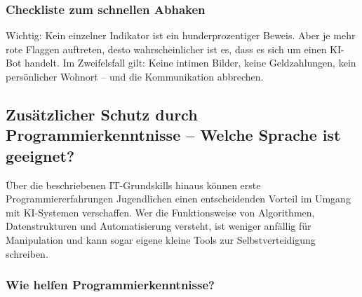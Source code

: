 \documentclass[12pt,a4paper,oneside]{scrartcl}
\begin{document}
	\subsubsection{Checkliste zum schnellen Abhaken}
	
	\noindent
	
	Wichtig: Kein einzelner Indikator ist ein hunderprozentiger Beweis. Aber je mehr rote Flaggen auftreten, desto wahrscheinlicher ist es, dass es sich um einen KI-Bot handelt. Im Zweifelsfall gilt: Keine intimen Bilder, keine Geldzahlungen, kein persönlicher Wohnort – und die Kommunikation abbrechen.
	
	\subsection{Zusätzlicher Schutz durch Programmierkenntnisse – Welche Sprache ist geeignet?}
	
	Über die beschriebenen IT-Grundskills hinaus können erste Programmiererfahrungen Jugendlichen einen entscheidenden Vorteil im Umgang mit KI-Systemen verschaffen. Wer die Funktionsweise von Algorithmen, Datenstrukturen und Automatisierung versteht, ist weniger anfällig für Manipulation und kann sogar eigene kleine Tools zur Selbstverteidigung schreiben.
	
	\subsubsection{Wie helfen Programmierkenntnisse?}
	
\end{document}
